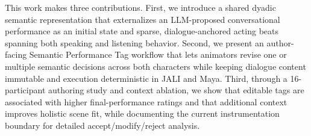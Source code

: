 This work makes three contributions. First, we introduce a shared dyadic semantic representation that externalizes an LLM-proposed conversational performance as an initial state and sparse, dialogue-anchored acting beats spanning both speaking and listening behavior. Second, we present an author-facing Semantic Performance Tag workflow that lets animators revise one or multiple semantic decisions across both characters while keeping dialogue content immutable and execution deterministic in JALI and Maya. Third, through a 16-participant authoring study and context ablation, we show that editable tags are associated with higher final-performance ratings and that additional context improves holistic scene fit, while documenting the current instrumentation boundary for detailed accept/modify/reject analysis.
